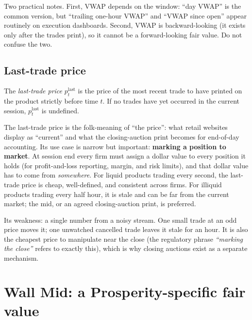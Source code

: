 Two practical notes. First, VWAP depends on the window: ``day
VWAP'' is the common version, but ``trailing one-hour VWAP'' and
``VWAP since open'' appear routinely on execution dashboards.
Second, VWAP is backward-looking (it exists only after the trades
print), so it cannot be a forward-looking fair value. Do not
confuse the two.

\subsection{Last-trade price}
\label{subsec:last_trade}

\begin{definition}
The \emph{last-trade price} $p^{\mathrm{last}}_t$ is the price of
the most recent trade to have printed on the product strictly before
time $t$. If no trades have yet occurred in the current session,
$p^{\mathrm{last}}_t$ is undefined.
\end{definition}

The last-trade price is the folk-meaning of ``the price'': what
retail websites display as ``current'' and what the closing-auction
print becomes for end-of-day accounting. Its use case is narrow but
important: \textbf{marking a position to market}. At session end
every firm must assign a dollar value to every position it holds
(for profit-and-loss reporting, margin, and risk limits), and that
dollar value has to come from \emph{somewhere}. For liquid products trading every
second, the last-trade price is cheap, well-defined, and consistent
across firms. For illiquid products trading every half hour, it is
stale and can be far from the current market; the mid, or an agreed
closing-auction print, is preferred.

Its weakness: a single number from a noisy stream. One small trade
at an odd price moves it; one unwatched cancelled trade leaves it
stale for an hour. It is also the cheapest price to manipulate near
the close (the regulatory phrase \emph{``marking the close''}
refers to exactly this), which is why closing auctions exist as a
separate mechanism.

\section{Wall Mid: a Prosperity-specific fair value}
\label{sec:wall_mid}

